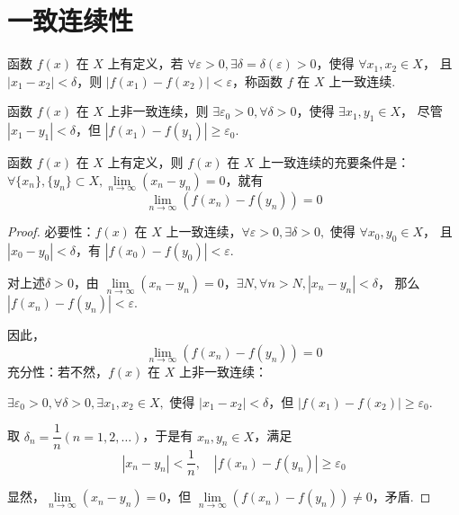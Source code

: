 \section{一致连续性}
\begin{definition}
	函数 \( f(x) \) 在 \(X\) 上有定义，若 \(\forall \varepsilon > 0, \exists \delta = \delta(\varepsilon) > 0\)，使得 \(\forall x_1, x_2 \in X\)，
	且 \(|x_1 - x_2| < \delta\)，则 \(|f(x_1) - f(x_2)| < \varepsilon\)，称函数 \(f\) 在 \(X\) 上一致连续.	
\end{definition}
\begin{definition}
	函数 \( f(x) \) 在 \(X\) 上非一致连续，则 \(\exists \varepsilon_0 > 0, \forall \delta > 0\)，使得 \(\exists x_1, y_1 \in X\)，
	尽管 \(|x_1 - y_1| < \delta\)，但 \(|f(x_1) - f(y_1)| \geqslant \varepsilon_0\).
\end{definition}
\begin{proposition}
	函数 \( f(x) \) 在 \(X\) 上有定义，则 \( f(x) \) 在 \(X\) 上一致连续的充要条件是：
	\(\forall \{x_n\}, \{y_n\} \subset X, \lim\limits_{n \to \infty} (x_n - y_n) = 0\)，就有
	\[ \lim_{n \to \infty} (f(x_n) - f(y_n)) = 0 \]
	
	
\end{proposition}
\begin{proof}
	必要性：\( f(x) \) 在 \(X\) 上一致连续，\(\forall \varepsilon > 0, \exists \delta > 0, \) 使得 \(\forall x_0, y_0 \in X\)，
	且 \(|x_0 - y_0| < \delta\)，有 \(|f(x_0) - f(y_0)| < \varepsilon\).
	
	对上述\(\delta > 0\)，由 \(\lim\limits_{n \to \infty} (x_n - y_n) = 0\)，\(\exists N, \forall n > N, |x_n - y_n| < \delta\)，
	那么 \(|f(x_n) - f(y_n)| < \varepsilon\).
	
	因此，\[\lim_{n \to \infty} (f(x_n) - f(y_n)) = 0\]
	充分性：若不然，\(f(x)\) 在 \(X\) 上非一致连续：
	
	\(\exists \varepsilon_0 > 0, \forall \delta > 0, \exists x_1, x_2 \in X, \) 使得 \(|x_1 - x_2| < \delta\)，但 \(|f(x_1) - f(x_2)| \geqslant \varepsilon_0\).
	
	取 \(\delta_n = \dfrac{1}{n} (n = 1, 2, \dots)\)，于是有 \(x_n, y_n \in X\)，满足
	\[ |x_n - y_n| < \frac{1}{n}, \quad |f(x_n) - f(y_n)| \geqslant \varepsilon_0 \]
	
	显然，\(\lim\limits_{n \to \infty} (x_n - y_n) = 0\)，但 \(\lim\limits_{n \to \infty} (f(x_n) - f(y_n)) \neq 0\)，矛盾.
	
\end{proof}
